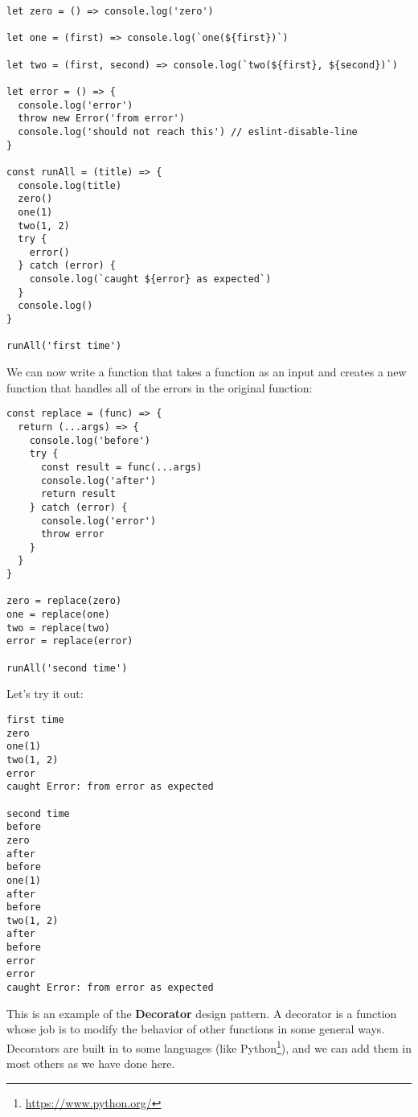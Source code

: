 \documentclass[krantzl]{krantz}
\newcommand{\glossref}[1]{\textbf{#1}}
\newcommand{\hreffoot}[2]{{#1}\footnote{\href{#2}{#2}}}
\begin{document}
\begin{lstlisting}[frame=single,frameround=tttt]
let zero = () => console.log('zero')

let one = (first) => console.log(`one(${first})`)

let two = (first, second) => console.log(`two(${first}, ${second})`)

let error = () => {
  console.log('error')
  throw new Error('from error')
  console.log('should not reach this') // eslint-disable-line
}

const runAll = (title) => {
  console.log(title)
  zero()
  one(1)
  two(1, 2)
  try {
    error()
  } catch (error) {
    console.log(`caught ${error} as expected`)
  }
  console.log()
}

runAll('first time')
\end{lstlisting}



We can now write a function that takes a function as an input
and creates a new function that handles all of the errors in the original function:


\begin{lstlisting}[frame=single,frameround=tttt]
const replace = (func) => {
  return (...args) => {
    console.log('before')
    try {
      const result = func(...args)
      console.log('after')
      return result
    } catch (error) {
      console.log('error')
      throw error
    }
  }
}

zero = replace(zero)
one = replace(one)
two = replace(two)
error = replace(error)

runAll('second time')
\end{lstlisting}



Let's try it out:


\begin{lstlisting}[frame=single,frameround=tttt]
first time
zero
one(1)
two(1, 2)
error
caught Error: from error as expected

second time
before
zero
after
before
one(1)
after
before
two(1, 2)
after
before
error
error
caught Error: from error as expected
\end{lstlisting}



This is an example of the \glossref{Decorator} design pattern.
A decorator is a function whose job is to modify the behavior of other functions
in some general ways.
Decorators are built in to some languages (like \hreffoot{Python}{https://www.python.org/}),
and we can add them in most others as we have done here.
\end{document}
